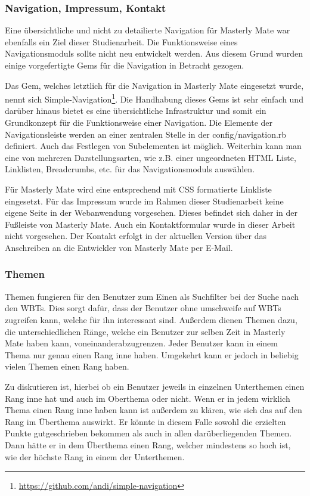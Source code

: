 \subsubsection{Navigation, Impressum, Kontakt}
Eine übersichtliche und nicht zu detailierte Navigation für Masterly Mate war
ebenfalls ein Ziel dieser Studienarbeit. Die Funktionsweise eines
Navigationsmoduls sollte nicht neu entwickelt werden. Aus diesem Grund wurden
einige vorgefertigte Gems für die Navigation in Betracht gezogen. 

Das Gem, welches letztlich für die Navigation in Masterly Mate eingesetzt wurde,
nennt sich Simple-Navigation\footnote{\url{https://github.com/andi/simple-navigation}}.
Die Handhabung dieses Gems ist sehr einfach und darüber hinaus bietet es eine
übersichtliche Infrastruktur und somit ein Grundkonzept für die Funktionsweise
einer Navigation. Die Elemente der Navigationsleiste werden an einer zentralen
Stelle in der config/navigation.rb definiert. Auch das Festlegen von
Subelementen ist möglich. Weiterhin kann man eine von mehreren 
Darstellungsarten, wie z.B. einer ungeordneten HTML Liste, Linklisten,
Breadcrumbs, etc. für das Navigationsmoduls auswählen. 

Für Masterly Mate wird eine entsprechend mit CSS formatierte Linkliste
eingesetzt. Für das Impressum wurde im Rahmen dieser Studienarbeit keine eigene
Seite in der Webanwendung vorgesehen. Dieses befindet sich daher in der Fußleiste von
Masterly Mate. Auch ein Kontaktformular wurde in dieser Arbeit nicht vorgesehen.
Der Kontakt erfolgt in der aktuellen Version über das Anschreiben an die
Entwickler von Masterly Mate per E-Mail. 

\subsubsection{Themen}
Themen fungieren für den Benutzer zum Einen als Suchfilter bei der Suche nach
den WBTs. Dies sorgt dafür, dass der Benutzer ohne umschweife auf WBTs zugreifen
kann, welche für ihn interessant sind. Außerdem dienen Themen dazu, die
unterschiedlichen Ränge, welche ein Benutzer zur selben Zeit in Masterly Mate
haben kann, voneinanderabzugrenzen. Jeder Benutzer kann in einem Thema nur genau
einen Rang inne haben. Umgekehrt kann er jedoch in beliebig vielen Themen einen
Rang haben.

Zu diskutieren ist, hierbei ob ein Benutzer jeweils in einzelnen Unterthemen
einen Rang inne hat und auch im Oberthema oder nicht. Wenn er in jedem wirklich
Thema einen Rang inne haben kann ist außerdem zu klären, wie sich das auf den
Rang im Überthema auswirkt. Er könnte in diesem Falle sowohl die erzielten
Punkte gutgeschrieben bekommen als auch in allen darüberliegenden Themen. Dann
hätte er in dem Überthema einen Rang, welcher mindestens so hoch ist, wie der
höchste Rang in einem der Unterthemen.
 
